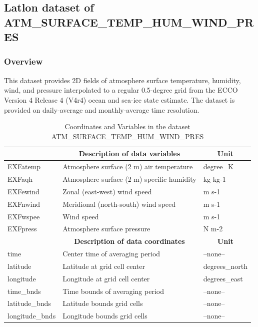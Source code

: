 \subsection{Latlon dataset of ATM\_SURFACE\_TEMP\_HUM\_WIND\_PRES}
\newp
\subsubsection{Overview}
This dataset provides 2D fields of atmosphere surface temperature, humidity, wind, and pressure interpolated to a regular 0.5-degree grid from the ECCO Version 4 Release 4 (V4r4) ocean and sea-ice state estimate. The dataset is provided on daily-average and monthly-average time resolution. 
\begin{longtable}{|m{}|m{}|m{}|}
\caption{Coordinates and Variables in the dataset ATM\_SURFACE\_TEMP\_HUM\_WIND\_PRES}
\label{tab:table-ATM_SURFACE_TEMP_HUM_WIND_PRES-fields} \\ 
\hline \endhead \hline \endfoot
\rowcolor{lightgray} \multicolumn{1}{|c|}{\textbf{Variables}} & \multicolumn{1}{|c|}{\textbf{Description of data variables}} &  \multicolumn{1}{|c|}{\textbf{Unit}}\\ \hline
EXFatemp &Atmosphere surface (2 m) air temperature  &degree\_K  \\ \hline
EXFaqh &Atmosphere surface (2 m) specific humidity  &kg kg-1  \\ \hline
EXFewind &Zonal (east-west) wind speed &m s-1  \\ \hline
EXFnwind &Meridional (north-south) wind speed &m s-1  \\ \hline
EXFwspee &Wind speed &m s-1  \\ \hline
EXFpress &Atmosphere surface pressure &N m-2  \\ \hline
\rowcolor{lightgray} \multicolumn{1}{|c|}{\textbf{Coordinates}} & \multicolumn{1}{|c|}{\textbf{Description of data coordinates}} &  \multicolumn{1}{|c|}{\textbf{Unit}}\\ \hline
time &Center time of averaging period &--none--  \\ \hline
latitude &Latitude at grid cell center &degrees\_north  \\ \hline
longitude &Longitude at grid cell center &degrees\_east  \\ \hline
time\_bnds &Time bounds of averaging period &--none--  \\ \hline
latitude\_bnds &Latitude bounds grid cells &--none--  \\ \hline
longitude\_bnds &Longitude bounds grid cells &--none--  \\ \hline
\end{longtable}

